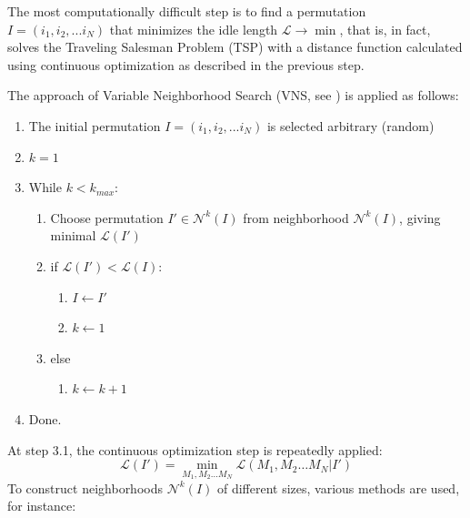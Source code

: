 \documentclass[]{interact}
\theoremstyle{plain}%
\theoremstyle{definition}
\theoremstyle{remark}
\begin{document}
The most computationally difficult step
is to find a permutation
$I = (i_1, i_2, ... i_N)$
that minimizes the idle length
$\mathcal{L} \to \min$,
that is, in fact,
solves the Traveling Salesman Problem (TSP)
with a distance function
calculated using continuous optimization
as described in the previous step.

The approach of
Variable Neighborhood Search
(VNS, see \cite{bi14}) is applied
as follows:

\begin{enumerate}[label*=\arabic*.]
  \item The initial permutation
  $I = (i_1, i_2, ... i_N)$
  is selected arbitrary
  (random)
  \item $k=1$
  \item While $k < k_{max}$:
  \begin{enumerate}[label*=\arabic*.]
    \item Choose permutation $I' \in \mathcal N^k(I)$
    from neighborhood $\mathcal N^k(I)$,
    giving minimal $\mathcal L(I')$
    \item if $\mathcal L(I')< \mathcal L(I)$:
    \begin{enumerate}[label*=\arabic*.]
      \item $I \gets I'$
      \item $k \gets 1$
    \end{enumerate}
    \item else
    \begin{enumerate}[label*=\arabic*.]
      \item $k \gets k+1$
    \end{enumerate}
  \end{enumerate}
  \item Done.
\end{enumerate}

At step 3.1,
the continuous optimization step is repeatedly applied:
$$
\mathcal L (I') = \min_{M_1, M_2 \dots M_N}
  \mathcal L (M_1, M_2 \dots M_N | I')
$$
To construct neighborhoods
$\mathcal N^k(I)$
of different sizes, various methods are used,
for instance:
\end{document}
